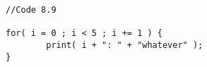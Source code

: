 \begin{lstlisting}[morekeywords={*, for}]
//Code 8.9

for( i = 0 ; i < 5 ; i += 1 ) {
		print( i + ": " + "whatever" );
}


\end{lstlisting}